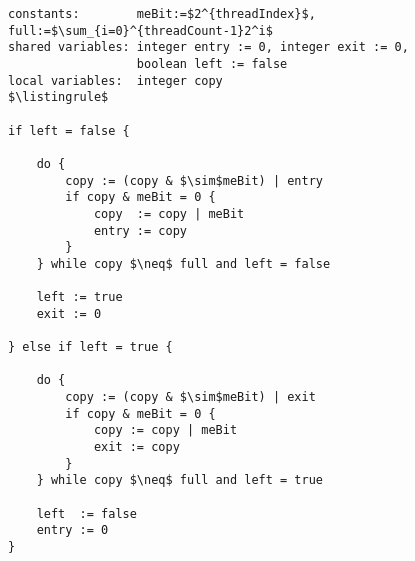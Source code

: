 \begin{lstlisting}[mathescape]
constants:        meBit:=$2^{threadIndex}$, full:=$\sum_{i=0}^{threadCount-1}2^i$
shared variables: integer entry := 0, integer exit := 0,
                  boolean left := false
local variables:  integer copy
$\listingrule$

if left = false {

	do {
		copy := (copy & $\sim$meBit) | entry
		if copy & meBit = 0 {
			copy  := copy | meBit
			entry := copy
		}
	} while copy $\neq$ full and left = false

	left := true
	exit := 0

} else if left = true {

	do {
		copy := (copy & $\sim$meBit) | exit
		if copy & meBit = 0 {
			copy := copy | meBit
			exit := copy
		}
	} while copy $\neq$ full and left = true

	left  := false
	entry := 0
}
\end{lstlisting}
